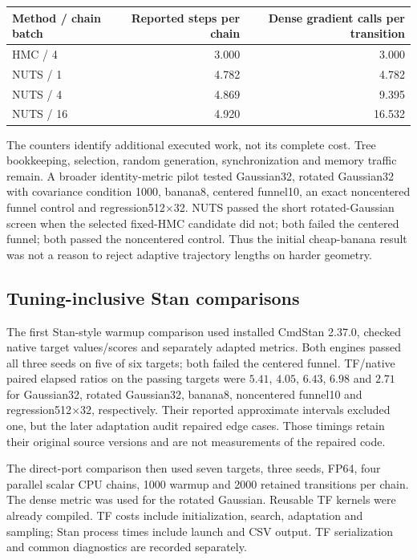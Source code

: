 \begin{center}\small
\begin{tabular}{lrr}
\toprule
Method / chain batch & Reported steps per chain & Dense gradient calls per transition\\
\midrule
HMC / 4 & 3.000 & 3.000\\
NUTS / 1 & 4.782 & 4.782\\
NUTS / 4 & 4.869 & 9.395\\
NUTS / 16 & 4.920 & 16.532\\
\bottomrule
\end{tabular}
\end{center}

The counters identify additional executed work, not its complete cost.
Tree bookkeeping, selection, random generation, synchronization and memory
traffic remain. A broader identity-metric pilot tested Gaussian32, rotated
Gaussian32 with covariance condition 1000, banana8, centered funnel10,
an exact noncentered funnel control and regression512$\times$32. NUTS
passed the short rotated-Gaussian screen when the selected fixed-HMC
candidate did not; both failed the centered funnel; both passed the
noncentered control. Thus the initial cheap-banana result was not a reason
to reject adaptive trajectory lengths on harder geometry.

\subsection{Tuning-inclusive Stan comparisons}

The first Stan-style warmup comparison used installed CmdStan 2.37.0,
checked native target values/scores and separately adapted metrics. Both
engines passed all three seeds on five of six targets; both failed the
centered funnel. TF/native paired elapsed ratios on the passing targets
were $5.41$, $4.05$, $6.43$, $6.98$ and $2.71$ for Gaussian32, rotated
Gaussian32, banana8, noncentered funnel10 and regression512$\times$32,
respectively. Their reported approximate intervals excluded one, but the
later adaptation audit repaired edge cases. Those timings retain their
original source versions and are not measurements of the repaired code.

The direct-port comparison then used seven targets, three seeds, FP64,
four parallel scalar CPU chains, 1000 warmup and 2000 retained transitions
per chain. The dense metric was used for the rotated Gaussian. Reusable
TF kernels were already compiled. TF costs include initialization, search,
adaptation and sampling; Stan process times include launch and CSV output.
TF serialization and common diagnostics are recorded separately.

